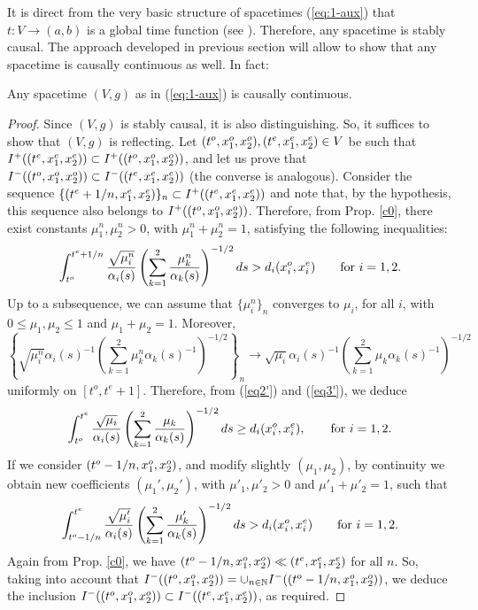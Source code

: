 It is direct from the very basic structure of \multiwarped spacetimes (\ref{eq:1-aux}) that $t:V \rightarrow (a,b)$ is a global time function (see \cite[Lemma 3.55]{beem}). Therefore, any \multiwarped spacetime is stably causal. The approach developed in previous section will allow to show that any \multiwarped spacetime is causally continuous as well. In fact:

\begin{thm}
Any \multiwarped spacetime $(V,g)$ as in (\ref{eq:1-aux}) is causally continuous.
\end{thm}

\begin{proof}  Since $(V,g)$ is stably causal, it is also distinguishing. So, it suffices to show that $(V,g)$ is reflecting. Let $(t^o,x_{1}^o,x_{2}^{o}), (t^{e},x_{1}^{e},x_{2}^{e}) \in V$ be such that
$I^{+}((t^{e},x_{1}^{e},x_{2}^{e})) \subset I^{+}((t^{o},x_{1}^{o},x_{2}^{o}))$, and let us prove that $I^{-}((t^{o},x_{1}^{o},x_{2}^{o}))
\subset I^{-}((t^{e},x_{1}^{e},x_{2}^{e}))$
(the converse is analogous). Consider the sequence $\{(t^{e}+1/n,x_{1}^{e},x_{2}^{e})\}_{n} \subset I^{+}((t^{e},x_{1}^{e},x_{2}^{e}))$ %
and note that, by the hypothesis, this sequence also belongs to $I^{+}((t^{o},x_{1}^{o},x_{2}^{o}))$.
Therefore, from Prop. \ref{c0}, there exist constants $\mu_{1}^{n},\mu_{2}^{n}>0$, with $\mu_{1}^{n} + \mu_{2}^{n}=1$, satisfying the following inequalities:
\begin{equation}
\label{eq2'}
\int_{t^{o}}^{t^{e}+1/n} \frac{\sqrt{\mu_{i}^{n}}}{\alpha_{i}(s)}\left(\sum_{k=1}^{2} \frac{\mu_{k}^{n}}{\alpha_{k}(s)} \right)^{-1/2}ds
> d_{i}(x_{i}^{o},x_{i}^{e})\qquad\hbox{for $i=1,2$}.
\end{equation}
Up to a subsequence, we can assume that $\{\mu_{i}^{n}\}_{n}$ converges to $\mu_i$, for all $i$, with $0 \leq \mu_{1},\mu_{2}\leq 1$ and $\mu_{1}+\mu_{2}=1$. Moreover,
\begin{equation}
\label{eq3'}
\left\{\sqrt{\mu_{i}^{n}}\alpha_{i}(s)^{-1}\left(\sum_{k=1}^2\mu_{k}^{n} \alpha_{k}(s)^{-1}\right)^{-1/2}\right\}_n \longrightarrow\sqrt{\mu_{i}}\alpha_{i}(s)^{-1}\left(\sum_{k=1}^2\mu_{k}\alpha_{k}(s)^{-1}\right)^{-1/2}
\end{equation}
uniformly on $[t^o,t^e+1]$. Therefore, from (\ref{eq2'}) and (\ref{eq3'}), we deduce
\[
\int_{t^{o}}^{t^{e}} \frac{\sqrt{\mu_{i}}}{\alpha_{i}(s)}\left(\sum_{k=1}^{2} \frac{\mu_{k}}{\alpha_{k}(s)} \right)^{-1/2}ds \geq d_{i}(x_{i}^{o},x_{i}^{e}),\qquad\hbox{for $i=1,2$.}
\]
If we consider $(t^{o}-1/n,x_{1}^{o},x_{2}^o)$, and modify slightly $(\mu_{1},\mu_{2})$, by continuity we obtain new coefficients $(\mu_{1}',\mu_{2}')$, with $\mu'_{1},\mu'_{2}>0$ and $\mu'_{1}+\mu'_{2}=1$, such that
\[
\int_{t^{o}-1/n}^{t^e} \frac{\sqrt{\mu'_{i}}}{\alpha_{i}(s)}\left(\sum_{k=1}^{2} \frac{\mu'_{k}}{\alpha_{k}(s)} \right)^{-1/2}ds
>
d_{i}(x^{o}_{i},x^{e}_{i})\qquad\hbox{for $i=1,2$.}
\]
Again from Prop. \ref{c0}, we have $(t^o-1/n,x_1^o,x_2^o) \ll (t^e,x_1^e,x_2^e)$
for all $n$. So, taking into account that $I^-((t^o,x_1^o,x_2^o))=\cup_{n \in {\mathbb N}}I^-((t^o-1/n,x_1^o,x_2^o))$, we deduce the inclusion $I^-((t^o,x_1^o,x_2^o) )\subset
I^-((t^e,x_1^e,x_2^e))$, as required.
\end{proof}
